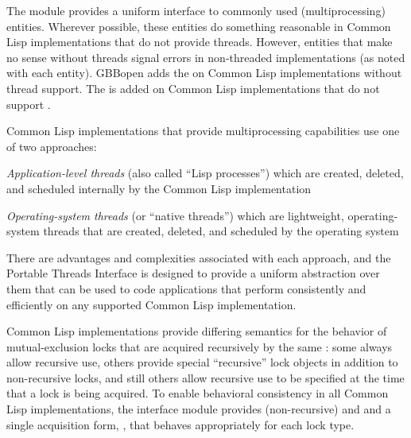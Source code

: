 
%
%
The  module provides a uniform interface to commonly
used  (multiprocessing) entities.  Wherever possible, these
entities do something reasonable in Common Lisp implementations that do not
provide threads. However, entities that make no sense without threads signal
errors in non-threaded implementations (as noted with each entity). GBBopen
adds the   on Common Lisp
implementations without thread support.  The 
 is added on Common Lisp implementations
that do not support \textbf{}.


Common Lisp implementations that provide multiprocessing capabilities use one
of two approaches:
\begin{tightitemize}
\item \textit{Application-level threads\/} (also called ``Lisp processes'') which are
  created, deleted, and scheduled internally by the Common Lisp implementation
\item \textit{Operating-system threads\/} (or ``native threads'') which are
  lightweight, operating-system threads that are created, deleted, and
  scheduled by the operating system
\end{tightitemize}

There are advantages and complexities associated with each approach, and the
Portable Threads Interface is designed to provide a uniform abstraction over
them that can be used to code applications that perform consistently and
efficiently on any supported Common Lisp implementation.


Common Lisp implementations provide differing semantics for the behavior of
mutual-exclusion locks that are acquired recursively by the same
: some always allow recursive use, others provide special
``recursive'' lock objects in addition to non-recursive locks, and still
others allow recursive use to be specified at the time that a lock is being
acquired.  To enable behavioral consistency in all Common Lisp
implementations, the  interface module provides
(non-recursive)  and  and a single
acquisition form, \textbf{}, that behaves
appropriately for each lock type.

